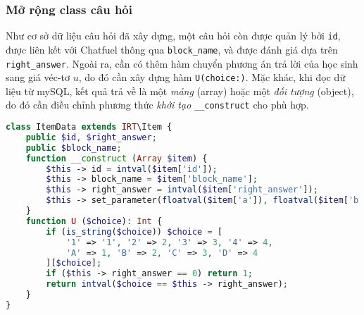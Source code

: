 \subsubsection{Mở rộng class câu hỏi}
Như cơ sở dữ liệu câu hỏi đã xây dựng, một câu hỏi còn được quản lý bởi \texttt{id}, được liên kết với Chatfuel thông qua \texttt{block\_name}, và được đánh giá dựa trên \texttt{right\_answer}. Ngoài ra, cần có thêm hàm chuyển phương án trả lời của học sinh sang giá véc-tơ $u$, do đó cần xây dựng hàm \texttt{U(choice:)}. Mặc khác, khi đọc dữ liệu từ mySQL, kết quả trả về là một \textit{mảng} (array) hoặc một \textit{đối tượng} (object), do đó cần điều chỉnh phương thức \textit{khởi tạo} \texttt{\_\_construct} cho phù hợp.
\begin{lstlisting}[language=php,caption=Mở rộng class câu hỏi]
class ItemData extends IRT\Item {
	public $id, $right_answer;
	public $block_name;
	function __construct (Array $item) {
		$this -> id = intval($item['id']);
		$this -> block_name = $item['block_name'];
		$this -> right_answer = intval($item['right_answer']);
		$this -> set_parameter(floatval($item['a']), floatval($item['b']));
	}
	function U ($choice): Int {
		if (is_string($choice)) $choice = [
			'1' => '1', '2' => 2, '3' => 3, '4' => 4,
			'A' => 1, 'B' => 2, 'C' => 3, 'D' => 4
		][$choice];
		if ($this -> right_answer == 0) return 1;
		return intval($choice == $this -> right_answer);
	}
}
\end{lstlisting}

